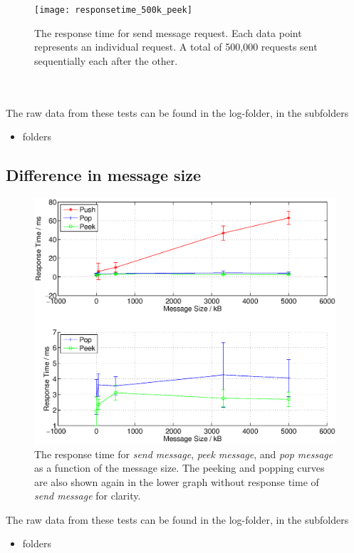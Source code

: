 \documentclass{article}
\begin{document}
                \begin{figure}[H]
                    \texttt{[image: responsetime\_500k\_peek]}
                    \caption{The response time for send message request. Each data point represents an individual request. A total of 500,000 requests sent sequentially each after the other.}
                    \label{fig:responsetime_500k_peek}
                \end{figure}
                ~\\
                \\
                The raw data from these tests can be found in the log-folder, in the subfolders
                \begin{itemize}
                    \item folders
                \end{itemize}

        \subsection{Difference in message size}
            \begin{figure}[H]
                    \hspace{-1.5cm}
                    \includegraphics[scale=0.60]{responsetime_msgsize}
                    \caption{The response time for \textit{send message}, \textit{peek message}, and \textit{pop message} as a function of the message size. The peeking and popping curves are also shown again in the lower graph without response time of \textit{send message} for clarity.}
                    \label{fig:responsetime_msgsize}
                \end{figure}
            The raw data from these tests can be found in the log-folder, in the subfolders
            \begin{itemize}
                \item folders
            \end{itemize}
\end{document}
